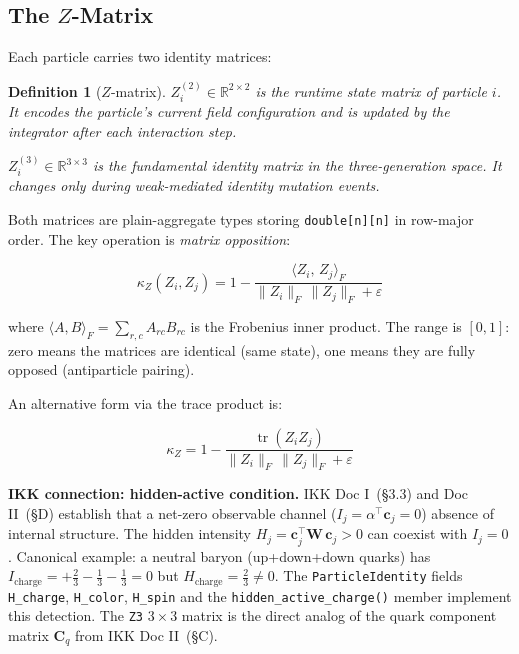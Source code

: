 \documentclass[11pt,a4paper]{article}
\theoremstyle{defbox}
\newtheorem{definition}{Definition}
\begin{document}
\subsection{The $Z$-Matrix}

Each particle carries two identity matrices:

\begin{definition}[$Z$-matrix]
$Z_i^{(2)} \in \mathbb{R}^{2\times 2}$ is the \emph{runtime state matrix} of
particle $i$.  It encodes the particle's current field configuration and is
updated by the integrator after each interaction step.

$Z_i^{(3)} \in \mathbb{R}^{3\times 3}$ is the \emph{fundamental identity
matrix} in the three-generation space.  It changes only during weak-mediated
identity mutation events.
\end{definition}

Both matrices are plain-aggregate types storing \texttt{double[n][n]} in
row-major order.  The key operation is \emph{matrix opposition}:

\begin{equation}
  \kappa_Z(Z_i, Z_j)
  = 1 - \frac{\langle Z_i,\, Z_j \rangle_F}{\|Z_i\|_F\,\|Z_j\|_F + \varepsilon}
\end{equation}

where $\langle A, B\rangle_F = \sum_{r,c} A_{rc}B_{rc}$ is the Frobenius inner
product.  The range is $[0, 1]$: zero means the matrices are identical
(same state), one means they are fully opposed (antiparticle pairing).

An alternative form via the trace product is:

\begin{equation}
  \kappa_Z = 1 - \frac{\operatorname{tr}(Z_i Z_j)}
					  {\|Z_i\|_F\,\|Z_j\|_F + \varepsilon}
\end{equation}

\noindent\textbf{IKK connection: hidden-active condition.}
IKK Doc I~(\S{}3.3) and Doc II~(\S{}D) establish that a net-zero observable
channel ($I_j = \alpha^\top \mathbf{c}_j = 0$)
absence of internal structure.  The hidden intensity
$H_j = \mathbf{c}_j^\top \mathbf{W}\, \mathbf{c}_j > 0$ can coexist with
$I_j = 0$.  Canonical example: a neutral baryon (up+down+down quarks) has
$I_\text{charge} = +\tfrac{2}{3} - \tfrac{1}{3} - \tfrac{1}{3} = 0$
but $H_\text{charge} = \tfrac{2}{3} \neq 0$.
The \texttt{ParticleIdentity} fields \texttt{H\_charge}, \texttt{H\_color},
\texttt{H\_spin} and the \texttt{hidden\_active\_charge()} member implement
this detection.  The \texttt{Z3} $3\times 3$ matrix is the direct analog of
the quark component matrix $\mathbf{C}_q$ from IKK Doc II~(\S{}C).
\end{document}
